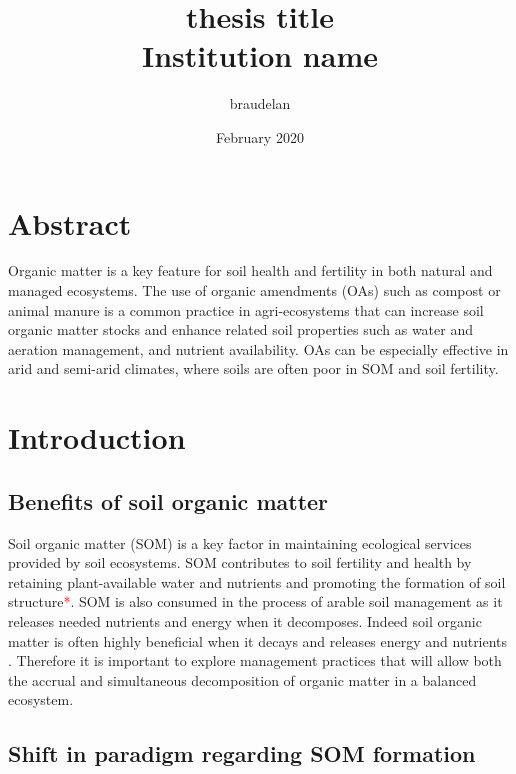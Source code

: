 \documentclass[12pt]{report}
\title{
    {thesis title}\\
    {\large Institution name}\\
}
\author{braudelan }
\date{February 2020}
\newcommand{\myRed}[1]{\textcolor{red}{#1}} %
\begin{document}
	\maketitle


	\chapter*{Abstract}
Organic matter is a key feature for soil health and fertility in both natural and managed ecosystems. The use of organic amendments (OAs) such as compost or animal manure is a common practice in agri-ecosystems that can increase soil organic matter stocks and enhance related soil properties such as  water and aeration management, and nutrient availability. OAs can be especially effective in arid and semi-arid climates, where soils are often poor in SOM and soil fertility.
        	
	
	
	\tableofcontents
	
	\chapter{Introduction}
	   \section{Benefits of soil organic matter}


	Soil organic matter (SOM) is a key factor in maintaining ecological services provided by soil ecosystems. 
	SOM contributes to soil fertility and health by retaining plant-available water and nutrients and promoting the formation of soil structure\myRed{*}. SOM is also consumed in the process of arable soil management as it releases needed nutrients and energy when it decomposes. Indeed soil organic matter is often highly beneficial when it decays and releases energy and nutrients \citep{lehmann2015}. Therefore it is important to explore  management practices that will allow both the accrual and simultaneous  decomposition of organic matter in a balanced ecosystem.
	
\section{Shift in paradigm regarding SOM formation}
	
\end{document}
